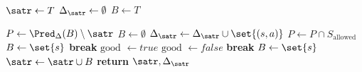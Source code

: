 \begin{algorithm}[t!]
    \caption{Computation of Strong Attractors}\label{alg:satr}
    \begin{algorithmic}[1]
            \State $\satr\gets  T$
            \State $\Delta_{\satr} \gets\emptyset$
            \State $B\gets T$

                \State $P\gets\Pred_\Delta(B)\setminus\satr$\label{alg:satr:pred}
                \State $B\gets\emptyset$
                \label{alg:satr:bdelta}
                            \State $\Delta_{\satr}\gets \Delta_{\satr}\cup\set{(s, a)}$
                        \EndIf
                    \EndFor
                \EndFor\label{alg:satr:edelta}
                \State $P\gets P\cap S_\text{allowed}$\label{alg:satr:allowed}
                \label{alg:satr:bcheck}
                                \State $B\gets\set{s}$
                                \State\textbf{break}
                            \EndIf
                        \EndFor
                    \Else
                        \State $\text{good }\gets true$
                                \State $\text{good }\gets false$
                                \State\textbf{break}
                            \EndIf
                        \EndFor
                            \State $B\gets\set{s}$
                        \EndIf
                    \EndIf
                \EndFor\label{alg:satr:echeck}
                \State $\satr\gets\satr\cup B$
            \EndWhile
            \State \textbf{return} $\satr, \Delta_{\satr}$
        \EndProcedure
    \end{algorithmic}
\end{algorithm}